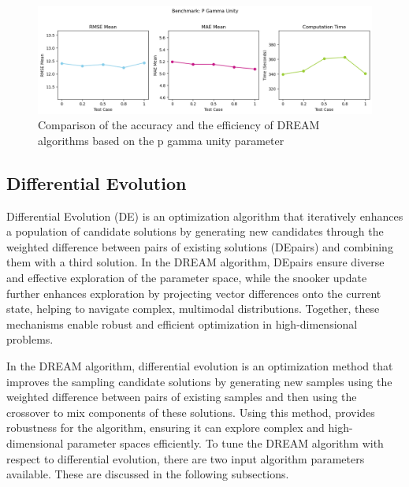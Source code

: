 \begin{figure}[H]
    \centering
    \includegraphics[width=1\textwidth]{figures/dream/gamma.png}
    \captionsetup{width=.8\textwidth}
    \caption{Comparison of the accuracy and the efficiency of DREAM algorithms based on the p gamma unity parameter}
    \label{fig:enter-label}
\end{figure}

\subsection{Differential Evolution}
Differential Evolution (DE) is an optimization algorithm that iteratively enhances a population of candidate solutions by generating new candidates through the weighted difference between pairs of existing solutions (DEpairs) and combining them with a third solution. In the DREAM algorithm, DEpairs ensure diverse and effective exploration of the parameter space, while the snooker update further enhances exploration by projecting vector differences onto the current state, helping to navigate complex, multimodal distributions. Together, these mechanisms enable robust and efficient optimization in high-dimensional problems.

In the DREAM algorithm, differential evolution is an optimization method that improves the sampling candidate solutions by generating new samples using the weighted difference between pairs of existing samples and then using the crossover to mix components of these solutions. Using this method, provides robustness for the algorithm, ensuring it can explore complex and high-dimensional parameter spaces efficiently. To tune the DREAM algorithm with respect to differential evolution, there are two input algorithm parameters available. These are discussed in the following subsections.


